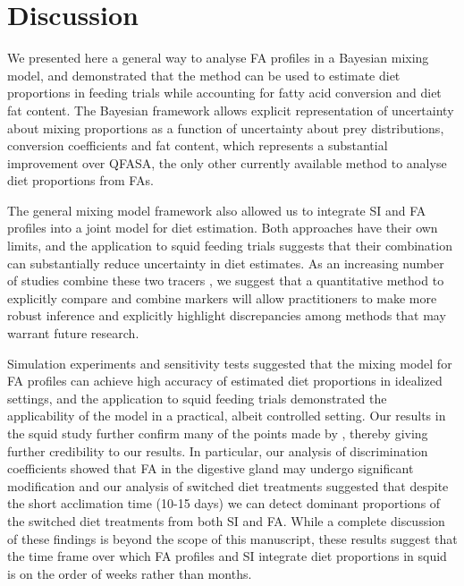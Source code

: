 \documentclass[fleqn,10pt]{wlpeerj}
\begin{document}
\section*{Discussion}

We presented here a general way to analyse FA profiles in a Bayesian mixing
model, and demonstrated that the method can be used to estimate diet proportions
in feeding trials while accounting for fatty acid conversion and diet
fat content. The Bayesian framework allows explicit representation of
uncertainty about mixing proportions as a function of uncertainty
about prey distributions, conversion coefficients and fat content,
which represents a substantial improvement over QFASA, the only other
currently available method to analyse diet proportions from FAs.

The general mixing model framework also allowed us to integrate SI and
FA profiles into a joint model for diet estimation. Both approaches have their
own limits, and the application to squid feeding trials suggests that their combination can substantially reduce uncertainty in diet estimates. As an increasing number of studies combine
these two tracers \citep{tucker_convergence_2008,guest_evidence_2008,guest_trophic_2009,stowasser_experimental_2006,van_der_bank_dietary_2011,jaschinski_carbon_2008},
we suggest that a quantitative method to explicitly compare and combine
markers will allow practitioners to make more robust inference and
explicitly highlight discrepancies among methods that may warrant
future research.

Simulation experiments and sensitivity tests suggested that the mixing model for FA profiles can
achieve high accuracy of estimated diet proportions in idealized
settings, and the application to squid feeding trials demonstrated the
applicability of the model in a practical, albeit controlled setting. Our results in the
squid study further confirm many of the points made by
\citet{stowasser_experimental_2006}, thereby giving further credibility to our
results. In particular, our analysis of discrimination coefficients
showed that FA in the digestive gland may undergo significant
modification and our analysis of switched diet treatments suggested
that despite the short acclimation time (10-15 days) we can detect
dominant proportions of the switched diet treatments from both SI and
FA. While a complete discussion of these findings is beyond the scope
of this manuscript, these results suggest that the time frame over
which FA profiles and SI integrate diet proportions in squid is on the order of
weeks rather than months.
\end{document}
